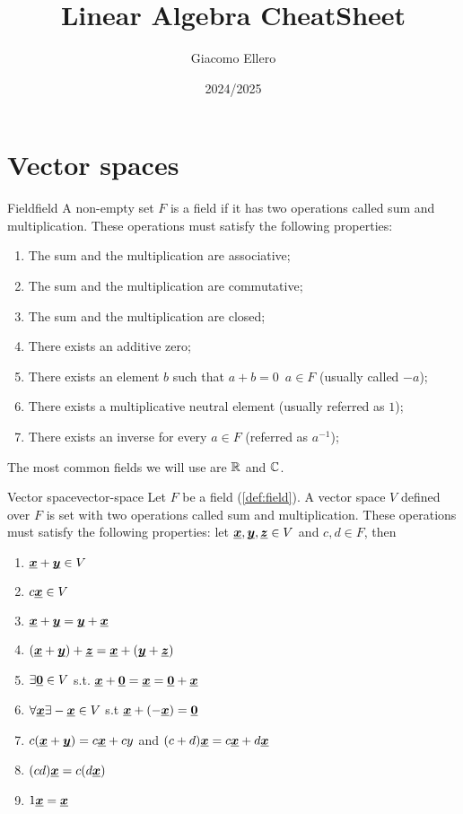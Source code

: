 \documentclass[12pt]{extarticle}
\title{Linear Algebra CheatSheet}
\author{Giacomo Ellero}
\date{2024/2025}
\renewcommand{\vec}[1]{\uvec{#1}}
\begin{document}
\firstpage

\section{Vector spaces}

\begin{definition}{Field}{field}
    A non-empty set $F$ is a field if it has two operations called sum and multiplication.
    These operations must satisfy the following properties:
    \begin{enumerate}
        \item The sum and the multiplication are associative;
        \item The sum and the multiplication are commutative;
        \item The sum and the multiplication are closed;
        \item There exists an additive zero;
        \item There exists an element $b$ such that $a+b = 0 \enspace a \in F$ (usually called $-a$);
        \item There exists a multiplicative neutral element (usually referred as $1$);
        \item There exists an inverse for every $a \in F$ (referred as $a^{-1}$);
    \end{enumerate}
\end{definition}

The most common fields we will use are $\mathbb{R}$ and $\mathbb{C}$.

\begin{definition}{Vector space}{vector-space}
    Let $F$ be a field (\cref{def:field}). A vector space $V$ defined over $F$ is set with two operations called sum and multiplication.
    These operations must satisfy the following properties: let $\vec{x} , \vec{y}, \vec{z} \in V$ and $c, d \in F$, then
    \begin{enumerate}
        \item $ \vec{x} +\vec{y} \in V$
        \item $c \vec{x}  \in V$
        \item $ \vec{x}  + \vec{y} = \vec{y}+  \vec{x} $
        \item $ (\vec x + \vec y) + \vec z = \vec x + (\vec y + \vec z)$
        \item $\exists \vec 0 \in V$ s.t. $ \vec{x} +\vec 0 =  \vec{x}  = \vec 0 +  \vec{x} $
        \item $\forall \vec x \exists -\vec x \in V$ s.t $\vec x + (-\vec x) = \vec 0 $
        \item $c( \vec{x} +\vec{y}) = c \vec{x}  + cy$ and $(c+d) \vec{x}  = c \vec{x}  + d \vec{x} $
        \item $(cd) \vec{x}  = c(d \vec{x} )$
        \item $1\vec x = \vec x$
    \end{enumerate}
\end{definition}
\end{document}

